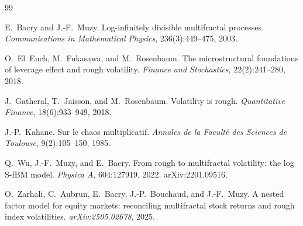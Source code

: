 \documentclass[11pt]{article}
\begin{document}

\begin{thebibliography}{99}

E.~Bacry and J.-F.~Muzy.
\newblock Log-infinitely divisible multifractal processes.
\newblock \emph{Communications in Mathematical Physics}, 236(3):449--475, 2003.

O.~El~Euch, M.~Fukasawa, and M.~Rosenbaum.
\newblock The microstructural foundations of leverage effect and rough volatility.
\newblock \emph{Finance and Stochastics}, 22(2):241--280, 2018.

J.~Gatheral, T.~Jaisson, and M.~Rosenbaum.
\newblock Volatility is rough.
\newblock \emph{Quantitative Finance}, 18(6):933--949, 2018.

J.-P.~Kahane.
\newblock Sur le chaos multiplicatif.
\newblock \emph{Annales de la Facult\'e des Sciences de Toulouse}, 9(2):105--150, 1985.

Q.~Wu, J.-F.~Muzy, and E.~Bacry.
\newblock From rough to multifractal volatility: the log S-fBM model.
\newblock \emph{Physica A}, 604:127919, 2022. arXiv:2201.09516.

O.~Zarhali, C.~Aubrun, E.~Bacry, J.-P.~Bouchaud, and J.-F.~Muzy.
\newblock A nested factor model for equity markets: reconciling multifractal stock returns and rough index volatilities.
\newblock \emph{arXiv:2505.02678}, 2025.

\end{thebibliography}
\end{document}
